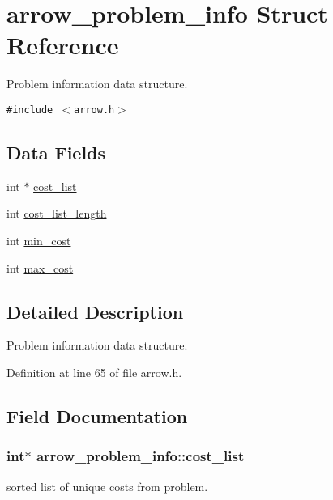 \hypertarget{structarrow__problem__info}{
\section{arrow\_\-problem\_\-info Struct Reference}
\label{structarrow__problem__info}
}
Problem information data structure.  


{\tt \#include $<$arrow.h$>$}

\subsection*{Data Fields}
\begin{CompactItemize}
\item 
int $\ast$ \hyperlink{structarrow__problem__info_7c9472312d7057fb9d74eb5579930216}{cost\_\-list}
\item 
int \hyperlink{structarrow__problem__info_54bbdc187af19361072480b45016f171}{cost\_\-list\_\-length}
\item 
int \hyperlink{structarrow__problem__info_46fabcc0ccd3a732cebb014331d4eeb5}{min\_\-cost}
\item 
int \hyperlink{structarrow__problem__info_724060f3be25521cca761899913c2776}{max\_\-cost}
\end{CompactItemize}


\subsection{Detailed Description}
Problem information data structure. 

Definition at line 65 of file arrow.h.

\subsection{Field Documentation}
\hypertarget{structarrow__problem__info_7c9472312d7057fb9d74eb5579930216}{
\subsubsection{\setlength{\rightskip}{0pt plus 5cm}int$\ast$ {\bf arrow\_\-problem\_\-info::cost\_\-list}}}
\label{structarrow__problem__info_7c9472312d7057fb9d74eb5579930216}


sorted list of unique costs from problem. 

